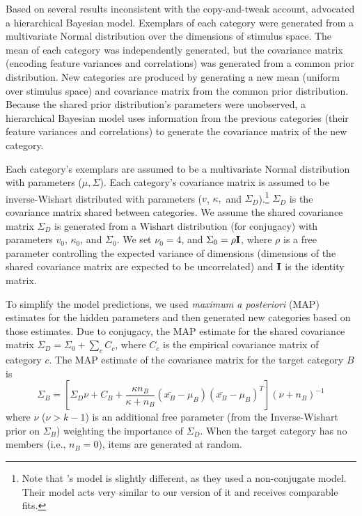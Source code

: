 \documentclass[10pt,letterpaper]{article}
\begin{document}
Based on several results inconsistent with the copy-and-tweak account, \citet{jern2013probabilistic} advocated a hierarchical Bayesian model. Exemplars of each category were generated from a multivariate Normal distribution over the dimensions of stimulus space. The mean of each category was independently generated, but the covariance matrix (encoding feature variances and correlations) was generated from a common prior distribution. New categories are produced by generating a new mean (uniform over stimulus space) and covariance matrix from the common prior distribution. Because the shared prior distribution's parameters were unobserved, a hierarchical Bayesian model uses information from the previous categories (their feature variances and correlations) to generate the covariance matrix of the new category.

Each category's exemplars are assumed to be a multivariate Normal distribution with parameters ($\mu, \Sigma$). Each category's covariance matrix is assumed to be inverse-Wishart distributed with parameters ($v$, $\kappa,$ and $\Sigma_D$).\footnote{Note that \citet{jern2013probabilistic}'s model is slightly different, as they used a non-conjugate model. Their model acts very similar to our version of it and receives comparable fits.} $\Sigma_D$ is the covariance matrix shared between categories. We assume the shared covariance matrix $\Sigma_D$ is generated from a Wishart distribution (for conjugacy) with parameters $v_0$, $\kappa_0$, and $\Sigma_0$. We set $\nu_0 = 4$, and $\Sigma_0 = \rho {\bf I}$, where $\rho$ is a free parameter controlling the expected variance of dimensions (dimensions of the shared covariance matrix are expected to be uncorrelated) and ${\bf I}$ is the identity matrix.

To simplify the model predictions, we used {\em maximum a posteriori} (MAP) estimates for the hidden parameters and then generated new categories based on those estimates. Due to conjugacy, the MAP estimate for the shared covariance matrix $\Sigma_D = \Sigma_0 + \sum_c{C_c}$, where $C_c$ is the empirical covariance matrix of category $c$. The MAP estimate of the covariance matrix for the target category $B$ is 
\begin{equation}
  \Sigma_B = \left[ \Sigma_D \nu + C_B +
    \dfrac
    {\kappa n_B}
    {\kappa + n_B}
    (\bar{x_B}-\mu_B)(\bar{x_B}-\mu_B)^T
  \right] (\nu + n_B)^{-1}
  \label{eq:Sigma_B}
\end{equation}
%
where $\nu$ ($\nu>k-1$) is an additional free parameter (from the Inverse-Wishart prior on $\Sigma_B$) weighting the importance of $\Sigma_{D}$. When the target category has no members (i.e., $n_B = 0$), items are generated at random.
\end{document}
